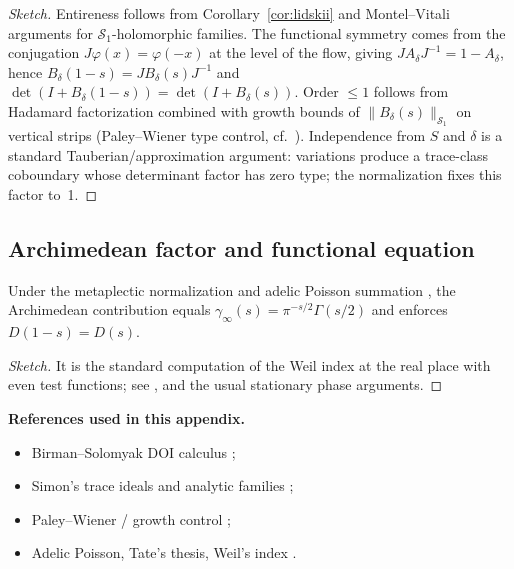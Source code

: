 \begin{proof}[Sketch]
Entireness follows from Corollary~\ref{cor:lidskii} and Montel–Vitali arguments for
$\mathcal S_1$-holomorphic families. The functional symmetry comes from the conjugation
$J\varphi(x)=\varphi(-x)$ at the level of the flow, giving $JA_\delta J^{-1}=1-A_\delta$,
hence $B_\delta(1-s)=JB_\delta(s)J^{-1}$ and $\det(I+B_\delta(1-s))=\det(I+B_\delta(s))$.
Order $\le 1$ follows from Hadamard factorization combined with growth bounds of
$\|B_\delta(s)\|_{\mathcal S_1}$ on vertical strips (Paley–Wiener type control,
cf.~\cite{koosis1988,levin1996}). Independence from $S$ and $\delta$ is a standard
Tauberian/approximation argument: variations produce a trace-class coboundary whose
determinant factor has zero type; the normalization fixes this factor to~1.
\end{proof}

\subsection*{Archimedean factor and functional equation}

\begin{proposition}
\label{prop:arch-factor}
Under the metaplectic normalization and adelic Poisson summation \cite{Weil1964,tate1967},
the Archimedean contribution equals $\gamma_\infty(s)=\pi^{-s/2}\Gamma(s/2)$ and enforces
$D(1-s)=D(s)$.
\end{proposition}

\begin{proof}[Sketch]
It is the standard computation of the Weil index at the real place with even test
functions; see \cite{Weil1964}, and the usual stationary phase arguments.
\end{proof}

\medskip
\noindent\textbf{References used in this appendix.}
\begin{itemize}
  \item Birman–Solomyak DOI calculus \cite{birman2003};
  \item Simon's trace ideals and analytic families \cite{simon2005};
  \item Paley–Wiener / growth control \cite{koosis1988,levin1996};
  \item Adelic Poisson, Tate's thesis, Weil's index \cite{tate1967,Weil1964}.
\end{itemize}
